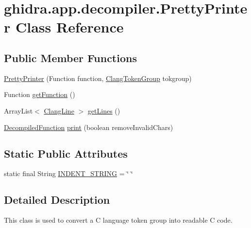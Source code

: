 \hypertarget{classghidra_1_1app_1_1decompiler_1_1_pretty_printer}{}\section{ghidra.\+app.\+decompiler.\+Pretty\+Printer Class Reference}
\label{classghidra_1_1app_1_1decompiler_1_1_pretty_printer}
\subsection*{Public Member Functions}
\begin{DoxyCompactItemize}
\item 
\mbox{\hyperlink{classghidra_1_1app_1_1decompiler_1_1_pretty_printer_adc2f50aa944639655ee214975112dd30}{Pretty\+Printer}} (Function function, \mbox{\hyperlink{classghidra_1_1app_1_1decompiler_1_1_clang_token_group}{Clang\+Token\+Group}} tokgroup)
\item 
Function \mbox{\hyperlink{classghidra_1_1app_1_1decompiler_1_1_pretty_printer_a08a4aabc621b7f5e68abf8d4a0a3b4c8}{get\+Function}} ()
\item 
Array\+List$<$ \mbox{\hyperlink{classghidra_1_1app_1_1decompiler_1_1_clang_line}{Clang\+Line}} $>$ \mbox{\hyperlink{classghidra_1_1app_1_1decompiler_1_1_pretty_printer_a5103857b7766874f3020fc59e4f616f2}{get\+Lines}} ()
\item 
\mbox{\hyperlink{classghidra_1_1app_1_1decompiler_1_1_decompiled_function}{Decompiled\+Function}} \mbox{\hyperlink{classghidra_1_1app_1_1decompiler_1_1_pretty_printer_ad36d28e52e9493186ac184c569f19fa9}{print}} (boolean remove\+Invalid\+Chars)
\end{DoxyCompactItemize}
\subsection*{Static Public Attributes}
\begin{DoxyCompactItemize}
\item 
static final String \mbox{\hyperlink{classghidra_1_1app_1_1decompiler_1_1_pretty_printer_a34a5c2dccbb9edc5153449f577118a0e}{I\+N\+D\+E\+N\+T\+\_\+\+S\+T\+R\+I\+NG}} = \char`\"{} \char`\"{}
\end{DoxyCompactItemize}


\subsection{Detailed Description}
This class is used to convert a C language token group into readable C code. 

